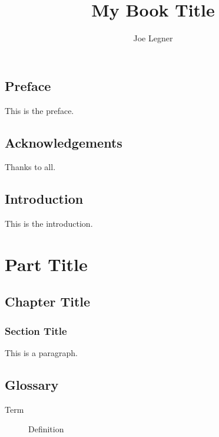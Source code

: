 \documentclass{book}
\begin{document}
\title{My Book Title}
\author{Joe Legner}
\date{}
\maketitle
\tableofcontents
\chapter*{Preface}
This is the preface.
\chapter*{Acknowledgements}
Thanks to all.
\chapter{Introduction}
This is the introduction.
\part{Part Title}
\chapter{Chapter Title}
\section{Section Title}
This is a paragraph.
\chapter*{Glossary}
\begin{description}
\item[Term] Definition
\end{description}
\printindex
\end{document}
